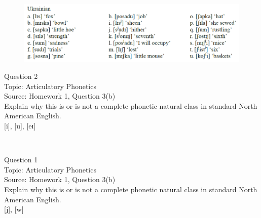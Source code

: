 \documentclass[12pt]{article}
\begin{document}
\begin{figure}[H]
\includegraphics{../images/ukrainian.png}
\end{figure}

\newpage

{\large Question 2}\\

Topic: Articulatory Phonetics\\
Source: Homework 1, Question 3(b)\\

Explain why this is or is not a complete phonetic natural class in standard North American English.\\

{[i]}, {[u]}, {[eɪ]}


\newpage

\begin{center}
\textbf{{\color{red}{\HUGE END OF EXAM}}}\\

\end{center}
\newpage

\begin{center}
\textbf{{\color{blue}{\HUGE START OF EXAM\\}}}

\textbf{{\color{blue}{\HUGE Student ID: 43736\\}}}

\textbf{{\color{blue}{\HUGE 4:40\\}}}

\end{center}
\newpage

{\large Question 1}\\

Topic: Articulatory Phonetics\\
Source: Homework 1, Question 3(b)\\

Explain why this is or is not a complete phonetic natural class in standard North American English.\\

{[j]}, {[w]}


\newpage
\end{document}
